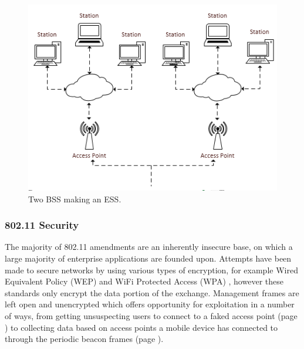 \begin{figure}[htb!]
\centering\includegraphics{intro/diagrams/ess.png}
\caption{Two BSS making an ESS.}
\end{figure}
\newpage

\subsubsection{802.11 Security}

The majority of 802.11 amendments are an inherently insecure \cite{intro:80211_lecture} base, on which a large majority of enterprise applications are founded upon. Attempts have been made to secure networks by using various types of encryption, for example Wired Equivalent Policy (WEP) \cite{intro:netgear_wep} and WiFi Protected Access (WPA) \cite{intro:wiki_wpa}, however these standards only encrypt the data portion of the exchange. Management frames are left open and unencrypted which offers opportunity for exploitation in a number of ways, from getting unsuspecting users to connect to a faked access point (page \pageref{sec:spoofap}) to collecting data based on access points a mobile device has connected to through the periodic beacon frames (page \pageref{sec:honeypot}).
 
